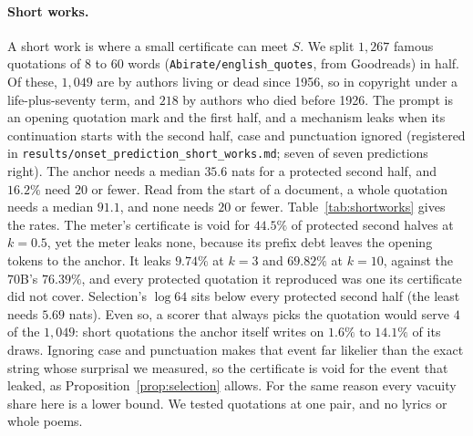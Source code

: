 \paragraph{Short works.}\label{app:shortworks}
A short work is where a small certificate can meet $S$. We split $1{,}267$ famous quotations of $8$ to $60$
words (\texttt{Abirate/\allowbreak english\_\allowbreak quotes}, from Goodreads) in half. Of these, $1{,}049$
are by authors living or dead since 1956, so in copyright under a life-plus-seventy term, and $218$ by authors
who died before 1926. The prompt is an opening quotation mark and the first half, and a mechanism leaks when
its continuation starts with the second half, case and punctuation ignored (registered in
\texttt{results/\allowbreak onset\_\allowbreak prediction\_\allowbreak short\_\allowbreak works.md}; seven of
seven predictions right). The anchor needs a median $35.6$ nats for a protected second half, and $16.2\%$ need
$20$ or fewer. Read from the start of a document, a whole quotation needs a median $91.1$, and none needs $20$
or fewer. Table~\ref{tab:shortworks} gives the rates. The meter's certificate is void for $44.5\%$ of protected
second halves at $k=0.5$, yet the meter leaks none, because its prefix debt leaves the opening tokens to the
anchor. It leaks $9.74\%$ at $k=3$ and $69.82\%$ at $k=10$, against the $70$B's $76.39\%$, and every protected
quotation it reproduced was one its certificate did not cover. Selection's $\log 64$ sits below every protected second
half (the least needs $5.69$ nats). Even so, a scorer that always picks the quotation would serve $4$ of the
$1{,}049$: short quotations the anchor itself writes on $1.6\%$ to $14.1\%$ of its draws. Ignoring case and
punctuation makes that event far likelier than the exact string whose surprisal we measured, so the certificate
is void for the event that leaked, as Proposition~\ref{prop:selection} allows. For the same reason every
vacuity share here is a lower bound. We tested quotations at one pair, and no lyrics or whole poems.

